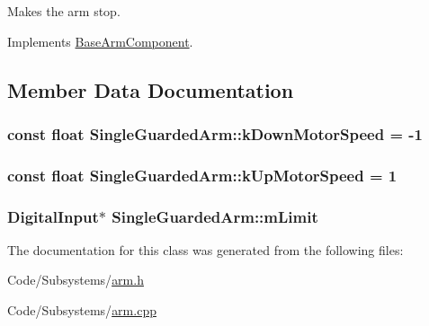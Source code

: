 \-Makes the arm stop. 



\-Implements \hyperlink{class_base_arm_component_abfb9d7005b18704f76b7cde4296dcca0}{\-Base\-Arm\-Component}.



\subsection{\-Member \-Data \-Documentation}
\hypertarget{class_single_guarded_arm_a8ea1ee43ded38095030020bb546dc62e}{
\subsubsection[{k\-Down\-Motor\-Speed}]{\setlength{\rightskip}{0pt plus 5cm}const float {\bf \-Single\-Guarded\-Arm\-::k\-Down\-Motor\-Speed} = -\/1}}\label{class_single_guarded_arm_a8ea1ee43ded38095030020bb546dc62e}
\hypertarget{class_single_guarded_arm_aa442ed29c8e99b475a4f46ecac051544}{
\subsubsection[{k\-Up\-Motor\-Speed}]{\setlength{\rightskip}{0pt plus 5cm}const float {\bf \-Single\-Guarded\-Arm\-::k\-Up\-Motor\-Speed} = 1}}\label{class_single_guarded_arm_aa442ed29c8e99b475a4f46ecac051544}
\hypertarget{class_single_guarded_arm_ad5da5518b0a0907955331bfec305478f}{
\subsubsection[{m\-Limit}]{\setlength{\rightskip}{0pt plus 5cm}\-Digital\-Input$\ast$ {\bf \-Single\-Guarded\-Arm\-::m\-Limit}}}\label{class_single_guarded_arm_ad5da5518b0a0907955331bfec305478f}


\-The documentation for this class was generated from the following files\-:\begin{DoxyCompactItemize}
\item 
\-Code/\-Subsystems/\hyperlink{arm_8h}{arm.\-h}\item 
\-Code/\-Subsystems/\hyperlink{arm_8cpp}{arm.\-cpp}\end{DoxyCompactItemize}
